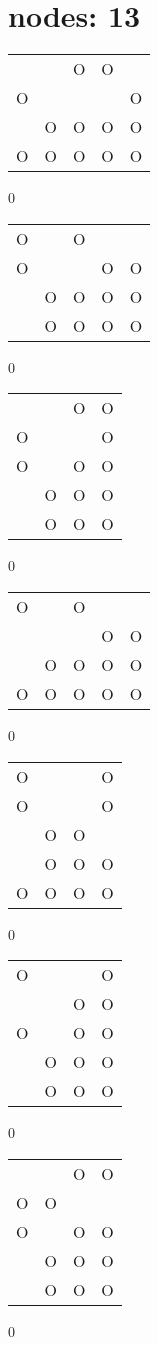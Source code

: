 \section{nodes: 13}
\begin{tabular}{|m{0.2cm}m{0.2cm}m{0.2cm}m{0.2cm}m{0.2cm}|}\hline
 & &O&O& \\
O& & & &O\\
 &O&O&O&O\\
O&O&O&O&O\\
\hline\end{tabular}0
\begin{tabular}{|m{0.2cm}m{0.2cm}m{0.2cm}m{0.2cm}m{0.2cm}|}\hline
O& &O& & \\
O& & &O&O\\
 &O&O&O&O\\
 &O&O&O&O\\
\hline\end{tabular}0
\begin{tabular}{|m{0.2cm}m{0.2cm}m{0.2cm}m{0.2cm}|}\hline
 & &O&O\\
O& & &O\\
O& &O&O\\
 &O&O&O\\
 &O&O&O\\
\hline\end{tabular}0
\begin{tabular}{|m{0.2cm}m{0.2cm}m{0.2cm}m{0.2cm}m{0.2cm}|}\hline
O& &O& & \\
 & & &O&O\\
 &O&O&O&O\\
O&O&O&O&O\\
\hline\end{tabular}0
\begin{tabular}{|m{0.2cm}m{0.2cm}m{0.2cm}m{0.2cm}|}\hline
O& & &O\\
O& & &O\\
 &O&O& \\
 &O&O&O\\
O&O&O&O\\
\hline\end{tabular}0
\begin{tabular}{|m{0.2cm}m{0.2cm}m{0.2cm}m{0.2cm}|}\hline
O& & &O\\
 & &O&O\\
O& &O&O\\
 &O&O&O\\
 &O&O&O\\
\hline\end{tabular}0
\begin{tabular}{|m{0.2cm}m{0.2cm}m{0.2cm}m{0.2cm}|}\hline
 & &O&O\\
O&O& & \\
O& &O&O\\
 &O&O&O\\
 &O&O&O\\
\hline\end{tabular}0
